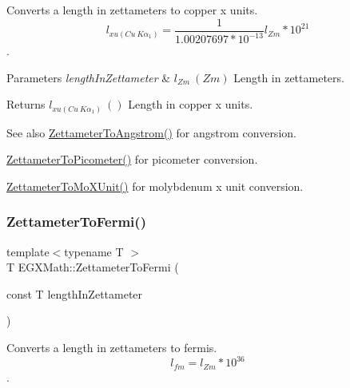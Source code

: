 Converts a length in zettameters to copper x units. \[ l_{xu(Cu\ K\alpha_1)}= \frac{1}{1.00207697*10^{-13}} l_{Zm} * 10^{21}\]. 


\begin{DoxyParams}{Parameters}
{\em length\+In\+Zettameter} & $ l_{Zm}\ (Zm)$ Length in zettameters. \\
\hline
\end{DoxyParams}
\begin{DoxyReturn}{Returns}
$ l_{xu(Cu\ K\alpha_1)}\ ()$ Length in copper x units. 
\end{DoxyReturn}
\begin{DoxySeeAlso}{See also}
\mbox{\hyperlink{group___e_g_x_math-_conversions-_length_conversions-_s_i-_zettameter-_non-_s_i_ga49d813ff9592fc1fc9a184436d0849fc}{Zettameter\+To\+Angstrom()}} for angstrom conversion. 

\mbox{\hyperlink{group___e_g_x_math-_conversions-_length_conversions-_s_i-_zettameter-_s_i_gae7835234c6727bbfd1e9ad40c54a4740}{Zettameter\+To\+Picometer()}} for picometer conversion. 

\mbox{\hyperlink{group___e_g_x_math-_conversions-_length_conversions-_s_i-_zettameter-_non-_s_i_ga10039261b7de3417e69110a56312b9ef}{Zettameter\+To\+Mo\+X\+Unit()}} for molybdenum x unit conversion. 
\end{DoxySeeAlso}
\mbox{\label{group___e_g_x_math-_conversions-_length_conversions-_s_i-_zettameter-_non-_s_i_ga791b0a401fe813fe4e6a34490f12a817}} 
\subsubsection{\texorpdfstring{Zettameter\+To\+Fermi()}{ZettameterToFermi()}}
{\footnotesize\ttfamily template$<$typename T $>$ \\
T E\+G\+X\+Math\+::\+Zettameter\+To\+Fermi (\begin{DoxyParamCaption}\item[{const T}]{length\+In\+Zettameter }\end{DoxyParamCaption})}



Converts a length in zettameters to fermis. \[ l_{fm}=l_{Zm} * 10^{36} \]. 


